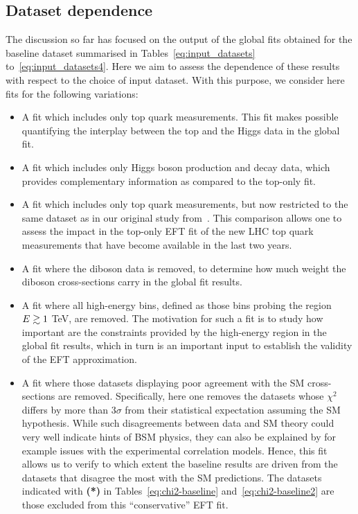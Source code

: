 \subsection{Dataset dependence}
\label{sec:dataset_dependence}

The discussion so far has focused on the output of the global fits
obtained for the baseline dataset summarised in
Tables~\ref{eq:input_datasets} to~\ref{eq:input_datasets4}.
%
Here we aim to assess the dependence of these results with respect to the choice
of input dataset.
%
With this purpose, we consider here fits for the following variations:
\begin{itemize}

\item A fit which includes only top quark measurements.
  This fit makes possible quantifying the interplay
  between the top and the Higgs data in the global fit.

\item A fit which includes only Higgs boson production and decay data,
  which provides complementary information as compared to
  the top-only fit.

\item  A fit which includes only top quark measurements, but now restricted to
  the same dataset as in our original study from~\cite{Hartland:2019bjb}.
  This comparison allows one to assess the impact
  in the top-only EFT fit of the new LHC top quark measurements that have
  become available in the last two years.

\item A fit where the diboson data is removed, to determine how much weight 
  the diboson cross-sections carry in the global fit results.

\item A fit where all high-energy bins, defined as those bins
  probing the region $E\gtrsim 1 $ TeV, are removed.
  The motivation for such a fit is to study how important are the constraints
  provided by the high-energy region in the global fit results,
  which in turn is an important input to  establish the validity
of the EFT approximation.

\item A fit where those datasets displaying poor agreement with the SM cross-sections
  are removed.
  Specifically, here one removes the datasets whose $\chi^2$ differs by more
than $3\sigma$ from their statistical expectation assuming the SM hypothesis.
%
While such disagreements between data and SM theory
could very well indicate hints of BSM physics, they can also be explained
by for example issues with the  experimental correlation models.
%
Hence, this fit  allows us to verify to which extent the baseline results
are driven from the datasets that disagree the most with the SM predictions.
%
{  The datasets indicated with {\bf (*)} in Tables~\ref{eq:chi2-baseline} and~\ref{eq:chi2-baseline2} are those
  excluded from this ``conservative'' EFT fit.}

  
\end{itemize}
